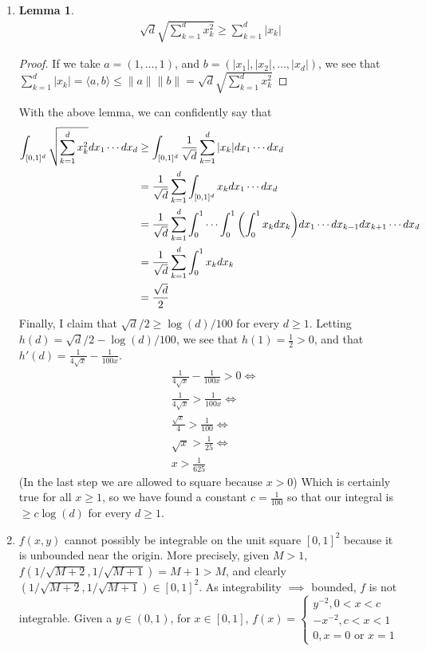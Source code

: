 \documentclass[12pt]{article}
\newtheorem{lemma}[theorem]{Lemma}
\theoremstyle{definition}
\theoremstyle{remark}
\renewcommand{\ip}[2]{\langle #1, #2 \rangle}
\newcommand{\mg}[1]{\| #1 \|}
\begin{document}
\begin{enumerate}[leftmargin=\labelsep]
		\item 
		\begin{lemma}
			\begin{align*}
				\sqrt{d} \sqrt{\sum_{k=1}^{d} x_k^2} \geq \sum_{k=1}^{d} |x_k|
			\end{align*}
		\end{lemma}
		\begin{proof}
			If we take $a = (1, \ldots, 1)$, and $b = (|x_1|, |x_2|, \ldots, |x_d|)$, we see that $\sum_{k=1}^{d} |x_k| = \ip{a}{b} \leq \mg{a}\mg{b} = \sqrt{d} \sqrt{\sum_{k=1}^{d} x_k^2}$
		\end{proof}
		With the above lemma, we can confidently say that
		\begin{align*}
			\int_{[0,1]^d} \sqrt{\sum_{k=1}^{d} x_k^2}dx_1\cdots dx_d &\geq \int_{[0, 1]^d} \frac1{\sqrt{d}} \sum_{k=1}^{d} |x_k| dx_1 \cdots dx_d \\ 
			&= \frac1{\sqrt{d}} \sum_{k=1}^{d} \int_{[0, 1]^d} x_k dx_1 \cdots dx_d \\
			&= \frac1{\sqrt{d}} \sum_{k=1}^{d} \int_0^1 \cdots \int_0^1 \qty(\int_0^1 x_k dx_k) dx_1 \cdots dx_{k-1} dx_{k+1} \cdots dx_d \\
			&= \frac1{\sqrt{d}} \sum_{k=1}^{d} \int_0^1 x_kdx_k \\
			&= \frac{\sqrt{d}}2
		\end{align*}
		Finally, I claim that $\sqrt{d}/2 \geq \log(d)/100$ for every $d \geq 1$. Letting $h(d) = \sqrt{d}/2 - \log(d)/100$, we see that $h(1) = \frac 12 > 0$, and that $h'(d) = \frac{1}{4\sqrt{x}}-\frac{1}{100x}$.
		\begin{align*}
			&\frac{1}{4\sqrt{x}}-\frac{1}{100x} > 0 \iff \\
			&\frac1{4\sqrt{x}} > \frac1{100x} \iff \\
			&\frac{\sqrt{x}}4 > \frac1{100} \iff \\
			&\sqrt{x} > \frac1{25} \iff \\
			&x > \frac1{625}
		\end{align*}
		(In the last step we are allowed to square because $x > 0$) Which is certainly true for all $x \geq 1$, so we have found a constant $c = \frac1{100}$ so that our integral is $\geq c\log(d)$ for every $d \geq 1$.
		
		\item 
		$f(x,y)$ cannot possibly be integrable on the unit square $[0, 1]^2$ because it is unbounded near the origin. More precisely, given $M > 1$, $f(1/\sqrt{M+2}, 1/\sqrt{M+1}) = M+1 > M$, and clearly $(1/\sqrt{M+2}, 1/\sqrt{M+1}) \in [0, 1]^2$. As integrability $\implies$ bounded, $f$ is not integrable. Given a $y \in (0, 1)$, for $x \in [0, 1]$, $f(x) = 
		\begin{cases}
			y^{-2}, 0 < x < c \\
			-x^{-2}, c < x < 1 \\
			0, x = 0 \text{ or } x = 1
		\end{cases}$
	

\end{enumerate}
\end{document}

